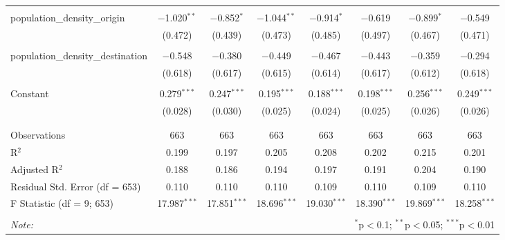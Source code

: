 \begin{table}[!htbp]
\begin{tabular}{@{\extracolsep{5pt}}lccccccc}
  & & & & & & & \\ 
 population\_density\_origin & $-$1.020$^{**}$ & $-$0.852$^{*}$ & $-$1.044$^{**}$ & $-$0.914$^{*}$ & $-$0.619 & $-$0.899$^{*}$ & $-$0.549 \\ 
  & (0.472) & (0.439) & (0.473) & (0.485) & (0.497) & (0.467) & (0.471) \\ 
  & & & & & & & \\ 
 population\_density\_destination & $-$0.548 & $-$0.380 & $-$0.449 & $-$0.467 & $-$0.443 & $-$0.359 & $-$0.294 \\ 
  & (0.618) & (0.617) & (0.615) & (0.614) & (0.617) & (0.612) & (0.618) \\ 
  & & & & & & & \\ 
 Constant & 0.279$^{***}$ & 0.247$^{***}$ & 0.195$^{***}$ & 0.188$^{***}$ & 0.198$^{***}$ & 0.256$^{***}$ & 0.249$^{***}$ \\ 
  & (0.028) & (0.030) & (0.025) & (0.024) & (0.025) & (0.026) & (0.026) \\ 
  & & & & & & & \\ 
\hline \\[-1.8ex] 
Observations & 663 & 663 & 663 & 663 & 663 & 663 & 663 \\ 
R$^{2}$ & 0.199 & 0.197 & 0.205 & 0.208 & 0.202 & 0.215 & 0.201 \\ 
Adjusted R$^{2}$ & 0.188 & 0.186 & 0.194 & 0.197 & 0.191 & 0.204 & 0.190 \\ 
Residual Std. Error (df = 653) & 0.110 & 0.110 & 0.110 & 0.109 & 0.110 & 0.109 & 0.110 \\ 
F Statistic (df = 9; 653) & 17.987$^{***}$ & 17.851$^{***}$ & 18.696$^{***}$ & 19.030$^{***}$ & 18.390$^{***}$ & 19.869$^{***}$ & 18.258$^{***}$ \\ 
\hline 
\hline \\[-1.8ex] 
\textit{Note:}  & \multicolumn{7}{r}{$^{*}$p$<$0.1; $^{**}$p$<$0.05; $^{***}$p$<$0.01} \\ 
\end{tabular} 
\end{table} 
